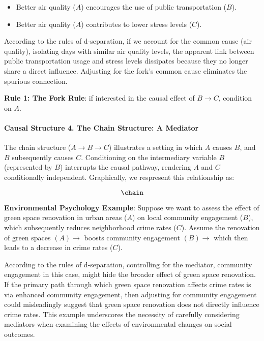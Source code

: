 \documentclass[
  singlecolumn]{article}
\let\oldparagraph\paragraph
\renewcommand{\paragraph}[1]{\oldparagraph{#1}\mbox{}}
\providecommand{\tightlist}{%
  \setlength{\itemsep}{0pt}\setlength{\parskip}{0pt}}\usepackage{longtable,booktabs,array}
\begin{document}
\begin{itemize}
\tightlist
\item
  Better air quality (\(A\)) encourages the use of public transportation
  (\(B\)).
\item
  Better air quality (\(A\)) contributes to lower stress levels (\(C\)).
\end{itemize}

According to the rules of d-separation, if we account for the common
cause (air quality), isolating days with similar air quality levels, the
apparent link between public transportation usage and stress levels
dissipates because they no longer share a direct influence. Adjusting
for the fork's common cause eliminates the spurious connection.

\textbf{Rule 1: The Fork Rule}: if interested in the causal effect of
\(B \to C\), condition on \(\boxed{A}\).

\paragraph{Causal Structure 4. The Chain Structure: A
Mediator}\label{causal-structure-4.-the-chain-structure-a-mediator}

The chain structure (\(A \rightarrow B \rightarrow C\)) illustrates a
setting in which \(A\) causes \(B\), and \(B\) subsequently causes
\(C\). Conditioning on the intermediary variable \(B\) (represented by
\(\boxed{B}\)) interrupts the causal pathway, rendering \(A\) and \(C\)
conditionally independent. Graphically, we respresent this relationship
as:

\[\chain\]

\textbf{Environmental Psychology Example}: Suppose we want to assess the
effect of green space renovation in urban areas (\(A\)) on local
community engagement (\(B\)), which subsequently reduces neighborhood
crime rates (\(C\)). Assume the renovation of green spaces
\((A) \rightarrow\) boosts community engagement \((B) \rightarrow\)
which then leads to a decrease in crime rates (\(C\)).

According to the rules of d-separation, controlling for the mediator,
community engagement in this case, might hide the broader effect of
green space renovation. If the primary path through which green space
renovation affects crime rates is via enhanced community engagement,
then adjusting for community engagement could misleadingly suggest that
green space renovation does not directly influence crime rates. This
example underscores the necessity of carefully considering mediators
when examining the effects of environmental changes on social outcomes.
\end{document}
